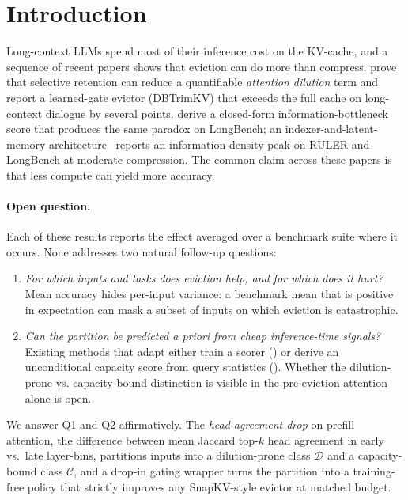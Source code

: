 \documentclass{article} %
\begin{document}
\section{Introduction}
\label{sec:intro}

Long-context LLMs spend most of their inference cost on the KV-cache, and a
sequence of recent papers shows that eviction can do more than compress.
\citet{arxiv260509649} prove that selective retention can reduce a quantifiable
\emph{attention dilution} term and report a learned-gate evictor (DBTrimKV) that
exceeds the full cache on long-context dialogue by several points.
\citet{arxiv260425975} derive a closed-form
information-bottleneck score that produces the same paradox on LongBench; an
indexer-and-latent-memory architecture~\citep{arxiv260525475}
reports an information-density peak on RULER and LongBench at moderate compression.
The common claim across these papers is that less compute can yield more accuracy.

\paragraph{Open question.} Each of these results reports the effect averaged over
a benchmark suite where it occurs. None addresses two natural follow-up questions:
\begin{enumerate}
  \item[(Q1)] \emph{For which inputs and tasks does eviction help, and for which
  does it hurt?} Mean accuracy hides per-input variance: a benchmark mean that is
  positive in expectation can mask a subset of inputs on which eviction is
  catastrophic.
  \item[(Q2)] \emph{Can the partition be predicted a priori from cheap inference-time
  signals?} Existing methods that adapt either train a scorer (\citealp{arxiv260509649,arxiv260525475,arxiv260203203,arxiv260210238})
  or derive an unconditional capacity score from query statistics
  (\citealp{arxiv260425975}). Whether the dilution-prone vs.
  capacity-bound distinction is visible in the pre-eviction attention alone is open.
\end{enumerate}

We answer Q1 and Q2 affirmatively. The \emph{head-agreement drop} on
prefill attention, the difference between mean Jaccard top-$k$ head
agreement in early vs.\ late layer-bins, partitions inputs into a
dilution-prone class $\mathcal{D}$ and a capacity-bound class
$\mathcal{C}$, and a drop-in gating wrapper turns the partition into a
training-free policy that strictly improves any SnapKV-style evictor at
matched budget.
\end{document}
